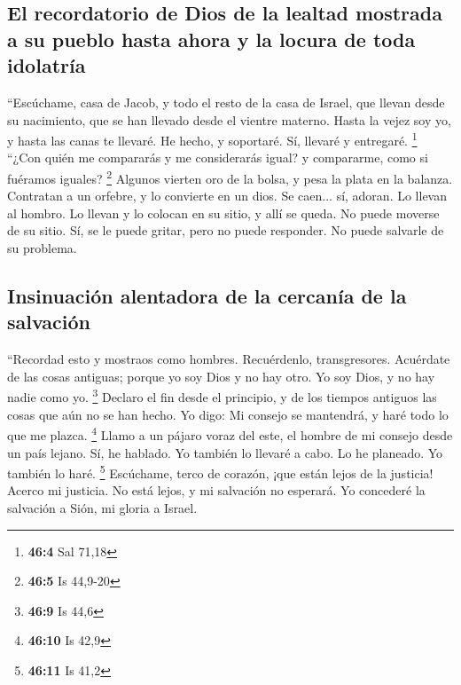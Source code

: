 \begin{paracol}{2}
\hypertarget{el-recordatorio-de-dios-de-la-lealtad-mostrada-a-su-pueblo-hasta-ahora-y-la-locura-de-toda-idolatruxeda}{%
\subsection{El recordatorio de Dios de la lealtad mostrada a su pueblo
hasta ahora y la locura de toda
idolatría}\label{el-recordatorio-de-dios-de-la-lealtad-mostrada-a-su-pueblo-hasta-ahora-y-la-locura-de-toda-idolatruxeda}}

 ``Escúchame, casa de Jacob, y todo el resto de la casa de
Israel, que llevan desde su nacimiento, que se han llevado desde el
vientre materno.  Hasta la vejez soy yo, y hasta las canas
te llevaré. He hecho, y soportaré. Sí, llevaré y entregaré. \footnote{\textbf{46:4}
  Sal 71,18}  ``¿Con quién me compararás y me considerarás
igual? y compararme, como si fuéramos iguales? \footnote{\textbf{46:5}
  Is 44,9-20}  Algunos vierten oro de la bolsa, y pesa la
plata en la balanza. Contratan a un orfebre, y lo convierte en un dios.
Se caen... sí, adoran.  Lo llevan al hombro. Lo llevan y
lo colocan en su sitio, y allí se queda. No puede moverse de su sitio.
Sí, se le puede gritar, pero no puede responder. No puede salvarle de su
problema.

\hypertarget{insinuaciuxf3n-alentadora-de-la-cercanuxeda-de-la-salvaciuxf3n}{%
\subsection{Insinuación alentadora de la cercanía de la
salvación}\label{insinuaciuxf3n-alentadora-de-la-cercanuxeda-de-la-salvaciuxf3n}}

 ``Recordad esto y mostraos como hombres. Recuérdenlo,
transgresores.  Acuérdate de las cosas antiguas; porque yo
soy Dios y no hay otro. Yo soy Dios, y no hay nadie como yo. \footnote{\textbf{46:9}
  Is 44,6}  Declaro el fin desde el principio, y de los
tiempos antiguos las cosas que aún no se han hecho. Yo digo: Mi consejo
se mantendrá, y haré todo lo que me plazca. \footnote{\textbf{46:10} Is
  42,9}  Llamo a un pájaro voraz del este, el hombre de
mi consejo desde un país lejano. Sí, he hablado. Yo también lo llevaré a
cabo. Lo he planeado. Yo también lo haré. \footnote{\textbf{46:11} Is
  41,2}  Escúchame, terco de corazón, ¡que están lejos de
la justicia!  Acerco mi justicia. No está lejos, y mi
salvación no esperará. Yo concederé la salvación a Sión, mi gloria a
Israel.


\end{paracol}
